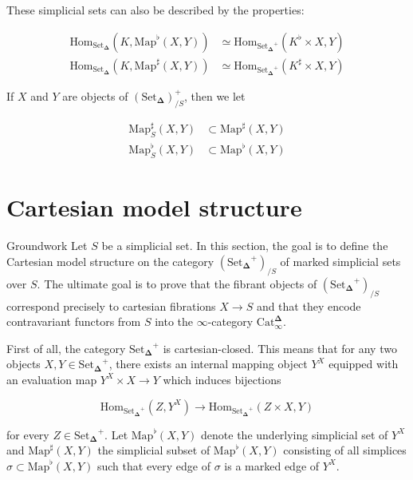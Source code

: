 \documentclass{beamer}[9pt]
\newcommand{\8}{\ensuremath{\infty}}
\newcommand{\SSet}{\ensuremath{\text{Set}_{\boldsymbol{\Delta}}}}
\newcommand{\Catinfdel}{\ensuremath{\text{Cat}^{\boldsymbol{\Delta}}_{\infty}}}
\newcommand{\Map}{\ensuremath{\text{Map}}}
\newcommand{\Hom}{\ensuremath{\text{Hom}}}
\begin{document}
\begin{frame}
  These simplicial sets can also be described by the properties:

  \begin{align*}
    \Hom_{\SSet}(K, \Map^\flat(X, Y))  & \simeq \Hom_{\SSet^+}(K^\flat\times X, Y)  \\
    \Hom_{\SSet}(K, \Map^\sharp(X, Y)) & \simeq \Hom_{\SSet^+}(K^\sharp\times X, Y)
  \end{align*}

  \pause

  If $X$ and $Y$ are objects of $(\SSet)^+_{/S}$, then we let

  \begin{align*}
    \Map_S^\sharp(X, Y) & \subset \Map^\sharp(X, Y) \\
    \Map_S^\flat(X, Y)  & \subset \Map^\flat(X, Y)
  \end{align*}
\end{frame}

\section{Cartesian model structure}

\begin{frame}{Groundwork}
  Let $S$ be a simplicial set. In this section, the goal is to define the Cartesian model structure on the category $(\SSet^+)_{/S}$ of marked simplicial sets over $S$. The ultimate goal is to prove that the fibrant objects of $(\SSet^+)_{/S}$ correspond precisely to cartesian fibrations $X \rightarrow S$ and that they encode contravariant functors from $S$ into the \8-category \Catinfdel.
\end{frame}

\begin{frame}
  First of all, the category $\SSet^+$ is cartesian-closed. This means that for any two objects $X, Y\in \SSet^+$, there exists an internal mapping object $Y^X$ equipped with an evaluation map $Y^X\times X \rightarrow Y$ which induces bijections

  $$
    \Hom_{\SSet^+}(Z, Y^X) \rightarrow \Hom_{\SSet^+}(Z\times X, Y)
  $$

  for every $Z \in \SSet^+$. Let $\Map^\flat(X, Y)$ denote the underlying simplicial set of $Y^X$ and $\Map^\sharp(X, Y)$ the simplicial subset of $\Map^\flat(X, Y)$ consisting of all simplices $\sigma\subset \Map^\flat(X, Y)$ such that every edge of $\sigma$ is a marked edge of $Y^X$.
\end{frame}
\end{document}
